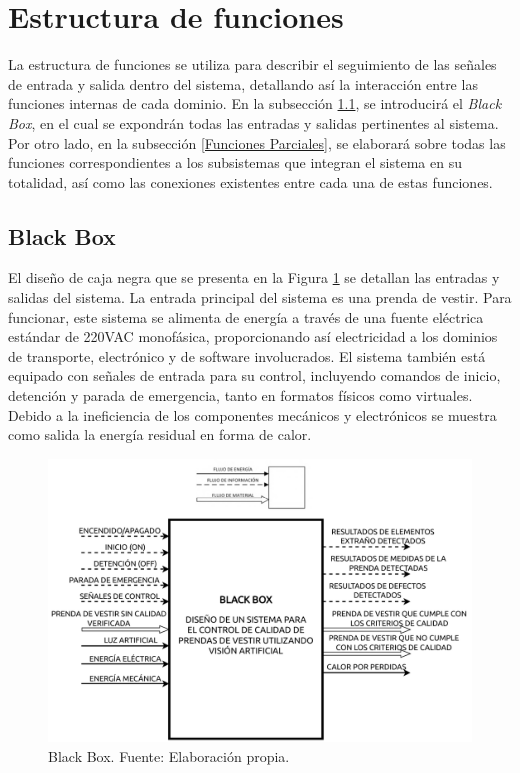 \section{Estructura de funciones}

La estructura de funciones se utiliza para describir el seguimiento de las señales de entrada y salida dentro del sistema, detallando así la interacción entre las funciones internas de cada dominio. En la subsección \ref{Black Box}, se introducirá el \textit{Black Box}, en el cual se expondrán todas las entradas y salidas pertinentes al sistema. Por otro lado, en la subsección \ref{Funciones Parciales}, se elaborará sobre todas las funciones correspondientes a los subsistemas que integran el sistema en su totalidad, así como las conexiones existentes entre cada una de estas funciones.

\subsection{Black Box}
\label{Black Box}

El diseño de caja negra que se presenta en la Figura \ref{fig:BLACK_BOX} se detallan las entradas y salidas del sistema. La entrada principal del sistema es una prenda de vestir. Para funcionar, este sistema se alimenta de energía a través de una fuente eléctrica estándar de 220VAC monofásica, proporcionando así electricidad a los dominios de transporte, electrónico y de software involucrados. El sistema también está equipado con señales de entrada para su control, incluyendo comandos de inicio, detención y parada de emergencia, tanto en formatos físicos como virtuales. Debido a la ineficiencia de los componentes mecánicos y electrónicos se muestra como salida la energía residual en forma de calor.

\begin{figure}[H]
	\centering
	\includegraphics[width=\textwidth]{img/BLACK_BOX.drawio.pdf}
	\caption[Black Box.]{Black Box. Fuente: Elaboración propia.}
	\label{fig:BLACK_BOX}
\end{figure}

